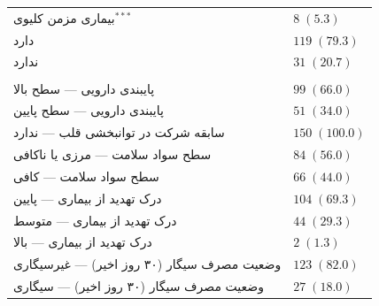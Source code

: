{\begin{xltabular}{\textwidth}{@{} >{\raggedright\arraybackslash}X >{\centering\arraybackslash}X @{}}
        بیماری مزمن کلیوی$^{***}$ & $8 \; (5.3)$ \\


        دارد & $119 \; (79.3)$ \\

        ندارد & $31 \; (20.7)$ \\

        \midrule




         \\

        \midrule

        پایبندی دارویی --- سطح بالا & $99 \; (66.0)$ \\

        پایبندی دارویی --- سطح پایین & $51 \; (34.0)$ \\


        سابقه شرکت در توانبخشی قلب --- ندارد & $150 \; (100.0)$ \\


        سطح سواد سلامت --- مرزی یا ناکافی & $84 \; (56.0)$ \\

        سطح سواد سلامت --- کافی & $66 \; (44.0)$ \\


        درک تهدید از بیماری --- پایین  & $104 \; (69.3)$ \\

        درک تهدید از بیماری --- متوسط   & $44 \; (29.3)$ \\

        درک تهدید از بیماری --- بالا    & $2 \; (1.3)$ \\


        وضعیت مصرف سیگار (۳۰ روز اخیر) --- غیرسیگاری & $123 \; (82.0)$ \\

        وضعیت مصرف سیگار (۳۰ روز اخیر) --- سیگاری   & $27 \; (18.0)$ \\



\end{xltabular}}
